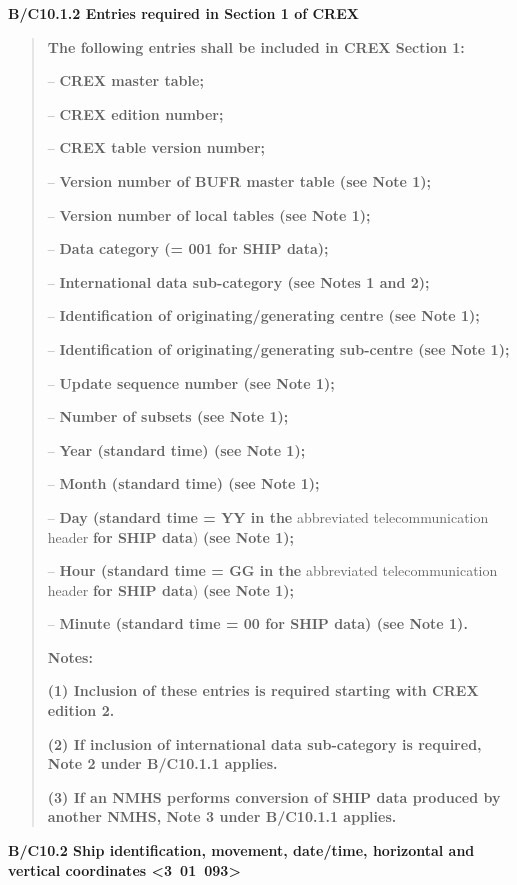 \textbf{B/C10.1.2 Entries required in Section 1 of CREX}

\begin{quote}
\textbf{The following entries shall be included in CREX Section 1:}

-- \textbf{CREX master table;}

-- \textbf{CREX edition number;}

-- \textbf{CREX table version number;}

-- \textbf{Version number of BUFR master table (see Note 1);}

-- \textbf{Version number of local tables (see Note 1);}

-- \textbf{Data category (= 001 for SHIP data);}

-- \textbf{International data sub-category (see Notes 1 and 2);}

-- \textbf{Identification of originating/generating centre (see Note 1);}

-- \textbf{Identification of originating/generating sub-centre (see Note 1);}

-- \textbf{Update sequence number (see Note 1);}

-- \textbf{Number of subsets (see Note 1);}

-- \textbf{Year (standard time) (see Note 1);}

-- \textbf{Month (standard time) (see Note 1);}

-- \textbf{Day (standard time = YY in the} abbreviated telecommunication header \textbf{for SHIP data}) \textbf{(see Note 1);}

-- \textbf{Hour (standard time = GG in the} abbreviated telecommunication header \textbf{for SHIP data}) \textbf{(see Note 1);}

-- \textbf{Minute (standard time = 00 for SHIP data) (see Note 1).}

\textbf{Notes:}

\textbf{(1) Inclusion of these entries is required starting with CREX edition 2.}

\textbf{(2) If inclusion of international data sub-category is required, Note 2 under B/C10.1.1 applies.}

\textbf{(3) If an NMHS performs conversion of SHIP data produced by another NMHS, Note 3 under B/C10.1.1 applies.}
\end{quote}

\textbf{B/C10.2 Ship identification, movement, date/time, horizontal and vertical coordinates \textless3~01~093\textgreater{}}

